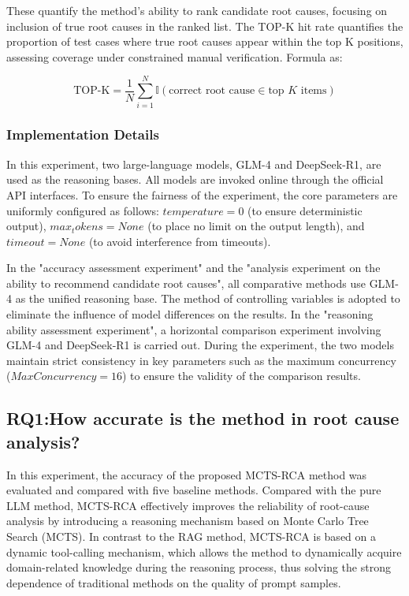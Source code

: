 \documentclass[10pt,conference]{IEEEtran}
\begin{document}
These quantify the method's ability to rank candidate root causes, focusing on inclusion of true root causes in the ranked list. The TOP-K hit rate quantifies the proportion of test cases where true root causes appear within the top K positions, assessing coverage under constrained manual verification. Formula as:

\begin{equation}
\text{TOP-K} = \frac{1}{N} \sum_{i = 1}^{N} \mathbb{I} \left( \text{correct root cause} \in \text{top } K \text{ items} \right)
\end{equation}

\subsubsection{Implementation Details}\label{ss:exp-impl}
In this experiment, two large-language models, GLM-4 and DeepSeek-R1, are used as the reasoning bases. All models are invoked online through the official API interfaces. To ensure the fairness of the experiment, the core parameters are uniformly configured as follows: $temperature = 0$ (to ensure deterministic output), $max_tokens = None$ (to place no limit on the output length), and $timeout = None$ (to avoid interference from timeouts).


In the "accuracy assessment experiment" and the "analysis experiment on the ability to recommend candidate root causes", all comparative methods use GLM-4 as the unified reasoning base. The method of controlling variables is adopted to eliminate the influence of model differences on the results. In the "reasoning ability assessment experiment", a horizontal comparison experiment involving GLM-4 and DeepSeek-R1 is carried out. During the experiment, the two models maintain strict consistency in key parameters such as the maximum concurrency ($Max Concurrency = 16$) to ensure the validity of the comparison results. 

\subsection{RQ1:How accurate is the method in root cause analysis?}\label{sec:rq1}
In this experiment, the accuracy of the proposed MCTS-RCA method was evaluated and compared with five baseline methods. Compared with the pure LLM method, MCTS-RCA effectively improves the reliability of root-cause analysis by introducing a reasoning mechanism based on Monte Carlo Tree Search (MCTS). In contrast to the RAG method, MCTS-RCA is based on a dynamic tool-calling mechanism, which allows the method to dynamically acquire domain-related knowledge during the reasoning process, thus solving the strong dependence of traditional methods on the quality of prompt samples.
\end{document}
